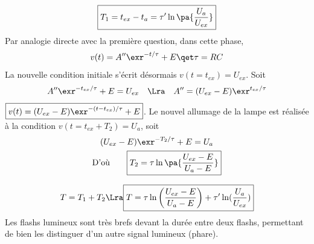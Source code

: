 \documentclass[a4paper, 10pt, garamond, oneside]{book}
\begin{document}
{\begin{enumerate}
\[			%
			\boxed{
			T_1 =
			t_{ex}-t_{a} =
			\tau' \ln\pa{\frac{U_{a}}{U_{ex}}}}
		\]
		 Par analogie directe avec la première question, dans cette phase,
		\[
			v(t) = A'' \exr^{-t/\tau} +E \qet \tau = RC
		\]
		\noindent
		La nouvelle condition initiale s'écrit désormais
		$v(t=t_{ex}) = U_{ex}$. Soit
		\[
			A'' \exr^{-t_{ex}/\tau} + E = U_{ex}
			\quad \Lra \quad
			A'' = (U_{ex}-E) \exr^{t_{ex}/\tau}
		\]
		{$\boxed{v(t) = (U_{ex}-E)\exr^{-(t-t_{ex})/\tau} + E}$}.
		\smallbreak
		Le nouvel allumage de la lampe est réalisée à la condition
		$v(t = t_{ex} + T_2) = U_{a}$, soit
		\begin{gather*}
			(U_{ex}-E)\exr^{-T_2/\tau} + E = U_{a}
			\\
			\text{D'où}\qquad
			\boxed{T_2 = \tau \ln\pa{\frac{U_{ex}-E}{U_{a}-E}}}
		\end{gather*}

		 \[
			T = T_1+T_2
			\Lra
			\boxed{
				T =
				\tau \ln\left(\frac{U_{ex}-E}{U_{a}-E}\right) +
				\tau' \ln(\frac{U_{a}}{U_{ex}})}
		\]
		Les flashs lumineux sont très brefs devant la durée entre deux flashs,
		permettant de bien les distinguer d'un autre signal lumineux (phare).
	\end{enumerate}
}

\newpage

\end{document}
